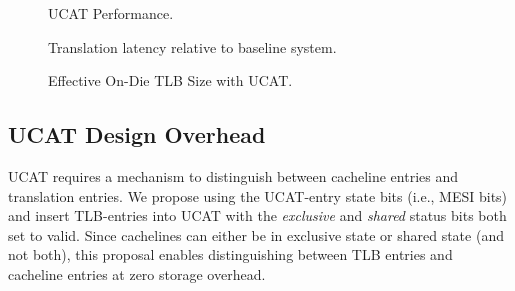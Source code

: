 \begin{figure}[tp] 
  \vspace{-0.in} \centering
  \centerline{}

  \caption{\small UCAT Performance. \normalsize}
  \label{fig:perf_UCAT} 
  \vspace{0.1 in}
\end{figure}

\begin{figure}[tp] 
  \vspace{0.in} \centering
  \centerline{}

  \caption{\small Translation latency relative to baseline system.\normalsize}
  \label{fig:tlblat_UCAT} 
  \vspace{-0.0 in}
\end{figure}

\begin{figure}[tp] 
  \vspace{0.in} \centering
  \centerline{}

  \caption{\small Effective On-Die TLB Size with UCAT.\normalsize}
  \label{fig:tlbsize_UCAT} 
  \vspace{-0.0 in}
\end{figure}


\subsection{UCAT Design Overhead}

\noindent UCAT requires a mechanism to distinguish between cacheline
entries and translation entries. We propose using the UCAT-entry state
bits (i.e., MESI bits) and insert TLB-entries into UCAT with the {\em
exclusive} and {\em shared} status bits both set to valid. Since
cachelines can either be in exclusive state or shared state (and not
both), this proposal enables distinguishing between TLB entries and
cacheline entries at zero storage overhead.

